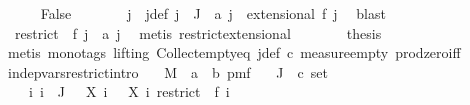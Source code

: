 \begin{isabellebody}
\ \ \ \ \isamarkupfalse%
\ False\isanewline
\ \ \ \ \isamarkupfalse%
\ \isamarkupfalse%
\ j\ \ j{\isacharunderscore}{\kern0pt}def{\isacharcolon}{\kern0pt}\ {\isachardoublequoteopen}j\ {\isasymin}\ J{\isacharprime}{\kern0pt}{\isachardoublequoteclose}\ \ {\isachardoublequoteopen}a\ j\ {\isasymnotin}\ extensional\ {\isacharparenleft}{\kern0pt}f\ j{\isacharparenright}{\kern0pt}{\isachardoublequoteclose}\ \isamarkupfalse%
\ blast\isanewline
\ \ \ \ \isamarkupfalse%
\ {\isachardoublequoteopen}{\isasymAnd}{\isasymomega}{\isachardot}{\kern0pt}\ restrict\ {\isasymomega}\ {\isacharparenleft}{\kern0pt}f\ j{\isacharparenright}{\kern0pt}\ {\isasymnoteq}\ a\ j{\isachardoublequoteclose}\ \isamarkupfalse%
\ {\isacharparenleft}{\kern0pt}metis\ restrict{\isacharunderscore}{\kern0pt}extensional{\isacharparenright}{\kern0pt}\isanewline
\ \ \ \ \isamarkupfalse%
\ \isamarkupfalse%
\ {\isacharquery}{\kern0pt}thesis\ \isanewline
\ \ \ \ \ \ \isamarkupfalse%
\ {\isacharparenleft}{\kern0pt}metis\ {\isacharparenleft}{\kern0pt}mono{\isacharunderscore}{\kern0pt}tags{\isacharcomma}{\kern0pt}\ lifting{\isacharparenright}{\kern0pt}\ Collect{\isacharunderscore}{\kern0pt}empty{\isacharunderscore}{\kern0pt}eq\ j{\isacharunderscore}{\kern0pt}def\ c\ measure{\isacharunderscore}{\kern0pt}empty\ prod{\isacharunderscore}{\kern0pt}zero{\isacharunderscore}{\kern0pt}iff{\isacharparenright}{\kern0pt}\isanewline
\ \ \isamarkupfalse%
\isanewline
{}\isamarkupfalse%
%
\endisatagproof
{\isafoldproof}%
%
\isadelimproof
\ \ \isanewline
%
\endisadelimproof
\isanewline
{}\isamarkupfalse%
\ indep{\isacharunderscore}{\kern0pt}vars{\isacharunderscore}{\kern0pt}restrict{\isacharunderscore}{\kern0pt}intro{\isacharcolon}{\kern0pt}\isanewline
\ \ \ M\ {\isacharcolon}{\kern0pt}{\isacharcolon}{\kern0pt}\ {\isachardoublequoteopen}{\isacharprime}{\kern0pt}a\ {\isasymRightarrow}\ {\isacharprime}{\kern0pt}b\ pmf{\isachardoublequoteclose}\isanewline
\ \ \ J\ {\isacharcolon}{\kern0pt}{\isacharcolon}{\kern0pt}\ {\isachardoublequoteopen}{\isacharprime}{\kern0pt}c\ set{\isachardoublequoteclose}\isanewline
\ \ \ {\isachardoublequoteopen}{\isasymAnd}{\isasymomega}\ i{\isachardot}{\kern0pt}\ i\ {\isasymin}\ J\ {\isasymLongrightarrow}\ \ X\ i\ {\isasymomega}\ {\isacharequal}{\kern0pt}\ X\ i\ {\isacharparenleft}{\kern0pt}restrict\ {\isasymomega}\ {\isacharparenleft}{\kern0pt}f\ i{\isacharparenright}{\kern0pt}{\isacharparenright}{\kern0pt}{\isachardoublequoteclose}\isanewline

\end{isabellebody}
